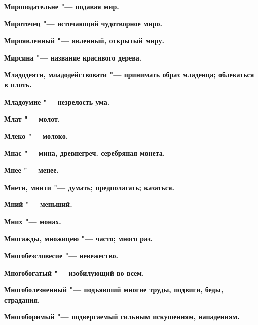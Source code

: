 \bfseries Мироподательне \normalfont{} "--- подавая мир. 




\bfseries Мироточец \normalfont{} "--- источающий чудотворное миро. 




\bfseries Мироявленный \normalfont{} "--- явленный, открытый миру. 




\bfseries Мирсина \normalfont{} "--- название красивого дерева. 




\bfseries Младодеяти, младодействовати \normalfont{} "--- принимать образ младенца; облекаться в плоть. 




\bfseries Младоумие \normalfont{} "--- незрелость ума. 




\bfseries Млат \normalfont{} "--- молот. 




\bfseries Млеко \normalfont{} "--- молоко. 




\bfseries Мнас \normalfont{} "--- мина, древнегреч. серебряная монета. 




\bfseries Мнее \normalfont{} "--- менее. 




\bfseries Мнети, мнити \normalfont{} "--- думать; предполагать; казаться. 




\bfseries Мний \normalfont{} "--- меньший. 




\bfseries Мних \normalfont{} "--- монах. 




\bfseries Многажды, множицею \normalfont{} "--- часто; много раз. 




\bfseries Многобезсловесие \normalfont{} "--- невежество. 




\bfseries Многобогатый \normalfont{} "--- изобилующий во всем. 




\bfseries Многоболезненный \normalfont{} "--- подъявший многие труды, подвиги, беды, страдания. 




\bfseries Многоборимый \normalfont{} "--- подвергаемый сильным искушениям, нападениям. 




